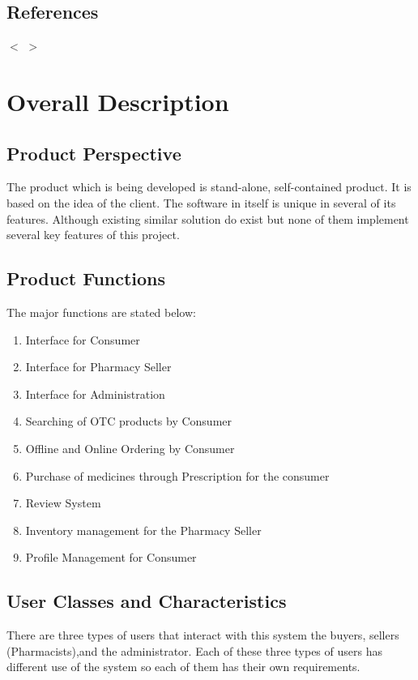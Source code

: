 \documentclass{scrreprt}
\begin{document}
\section{References}
$<$   $>$


\chapter{Overall Description}

\section{Product Perspective}
The product which is being developed is stand-alone, self-contained product. It is based on the idea of the client. The software in itself is unique in several of its features. Although existing similar solution do exist but none of them implement several key features of this project.

\section{Product Functions}
The major functions are stated below:
\begin{enumerate}
\item	Interface for Consumer
\item	Interface for Pharmacy Seller
\item	Interface for Administration
\item	Searching of OTC products by Consumer
\item	Offline and Online Ordering by Consumer
\item	Purchase of medicines through Prescription for the consumer
\item	Review System
\item	Inventory management for the Pharmacy Seller
\item	Profile Management for Consumer
\end{enumerate}

\section{User Classes and Characteristics}
\item There are three types of users that interact with this system the buyers, sellers (Pharmacists),and the administrator. Each of these three types of users has different use of the system so each of them has their own requirements.   \\
\end{document}
